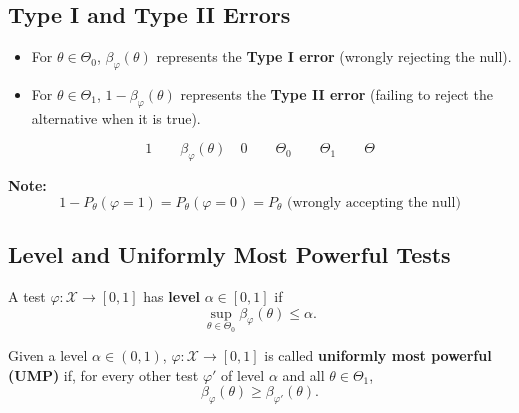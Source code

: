 \documentclass[open=any, 11pt,paper=A4]{scrreprt}
\begin{document}
\subsection{Type I and Type II Errors}
\begin{itemize}
    \item For \(\theta \in \Theta_0\), \( \beta_\varphi(\theta) \) represents the \textbf{Type I error} (wrongly rejecting the null).
    \item For \(\theta \in \Theta_1\), \(1 - \beta_\varphi(\theta)\) represents the \textbf{Type II error} (failing to reject the alternative when it is true).
\end{itemize}

\[
1 \quad \quad \beta_\varphi(\theta) \quad 0 \quad \quad \Theta_0 \quad \quad \Theta_1 \quad \quad \Theta
\]

\textbf{Note:}
\[
1 - P_\theta (\varphi = 1) = P_\theta (\varphi = 0) = P_\theta \text{ (wrongly accepting the null)}
\]

\subsection{Level and Uniformly Most Powerful Tests}
\begin{definition}[Level]
A test \( \varphi : \mathcal{X} \to [0,1] \) has \textbf{level} \( \alpha \in [0,1] \) if
\[
\sup_{\theta \in \Theta_0} \beta_\varphi (\theta) \leq \alpha.
\]
\end{definition}

\begin{definition}
Given a level \( \alpha \in (0,1) \), \( \varphi : \mathcal{X} \to [0,1] \) is called \textbf{uniformly most powerful (UMP)} if, for every other test \( \varphi' \) of level \( \alpha \) and all \( \theta \in \Theta_1 \),
\[
\beta_\varphi (\theta) \geq \beta_{\varphi'}(\theta).
\]
\end{definition}
\end{document}
